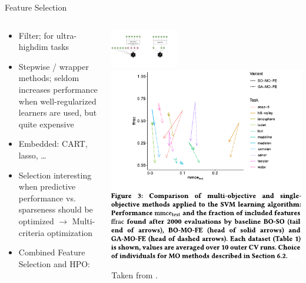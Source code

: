 \begin{frame}{Feature Selection}
    \begin{columns}
      \begin{column}{0.4\textwidth}
        \begin{itemize}
          \item Filter; for ultra-highdim tasks
          \item Stepwise / wrapper methods; 
          seldom increases performance when well-regularized 
              learners are used, but quite expensive 
          \item Embedded: CART, lasso, \ldots 
          \item Selection interesting when predictive performance vs. sparseness
              should be optimized $\rightarrow$ Multi-criteria optimization
            \item Combined Feature Selection and HPO: 
        \end{itemize}
      \end{column}%
      \begin{column}{0.6\textwidth}
        \begin{center}
          \includegraphics[width=0.35\textwidth, trim=450 100 110 60, clip]{images/feat_extr_vs_selection.pdf}%
          \includegraphics[width=0.55\linewidth]{images/Binder2020multiobjective_fig3.pdf}

          {\tiny \hfill Taken from .}
        \end{center}
      \end{column}
    \end{columns}
    
\end{frame}

